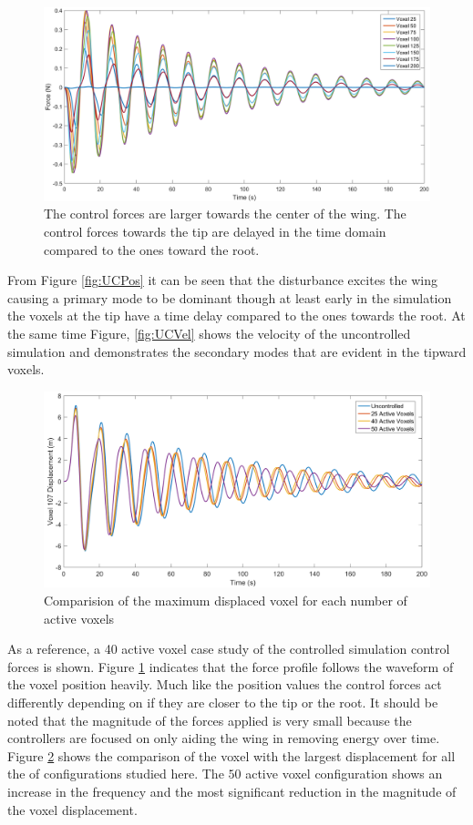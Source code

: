 \documentclass[11pt]{ucthesis}
\begin{document}
\begin{figure}[thpb]
\centering
\includegraphics[width=0.9\linewidth]{Figures/LMIControl.png}
\caption{The control forces are larger towards the center of the wing. The control forces towards the tip are delayed in the time domain compared to the ones toward the root.}
\label{fig:control}
\end{figure}

From Figure \ref{fig:UCPos} it can be seen that the disturbance excites the wing causing a primary mode to be dominant though at least early in the simulation the voxels at the tip have a time delay compared to the ones towards the root. At the same time Figure, \ref{fig:UCVel} shows the velocity of the uncontrolled simulation and demonstrates the secondary modes that are evident in the tipward voxels.

\begin{figure}[thpb]
\centering
\includegraphics[width=0.9\linewidth]{Figures/LMIMaxVoxelComparison.png}
\caption{Comparision of the maximum displaced voxel for each number of active voxels}
\label{fig:maxVoxel}
\end{figure}

As a reference, a 40 active voxel case study of the controlled simulation control forces is shown. Figure \ref{fig:control} indicates that the force profile follows the waveform of the voxel position heavily. Much like the position values the control forces act differently depending on if they are closer to the tip or the root. It should be noted that the magnitude of the forces applied is very small because the controllers are focused on only aiding the wing in removing energy over time. Figure \ref{fig:maxVoxel} shows the comparison of the voxel with the largest displacement for all the of configurations studied here. The $50$ active voxel configuration shows an increase in the frequency and the most significant reduction in the magnitude of the voxel displacement.
\end{document}
